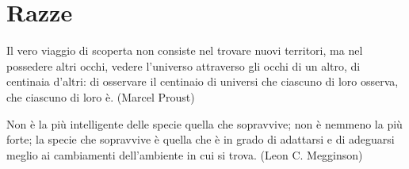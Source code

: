 \section{Razze}

\begin{changemargin}{0.3cm}{0.3cm}\begin{enfasi}{Il vero viaggio di scoperta non consiste nel trovare nuovi territori, ma nel possedere altri occhi, vedere l'universo attraverso gli occhi di un altro, di centinaia d'altri: di osservare il centinaio di universi che ciascuno di loro osserva, che ciascuno di loro è. (Marcel Proust)

\medskip

Non è la più intelligente delle specie quella che sopravvive; non è nemmeno la più forte; la specie che sopravvive è quella che è in grado di adattarsi e di adeguarsi meglio ai cambiamenti dell'ambiente in cui si trova. (Leon C. Megginson)}\end{enfasi}\end{changemargin}\medskip

